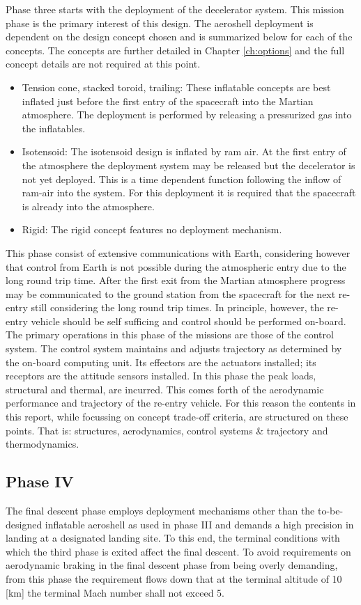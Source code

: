 Phase three starts with the deployment of the decelerator system. This mission phase is the primary interest of this design. The aeroshell deployment is dependent on the design concept chosen and is summarized below for each of the concepts. The concepts are further detailed in Chapter \ref{ch:options} and the full concept details are not required at this point.

\begin{itemize}
\item Tension cone, stacked toroid, trailing: These inflatable concepts are best inflated just before the first entry of the spacecraft into the Martian atmosphere. The deployment is performed by releasing a pressurized gas into the inflatables.
\item Isotensoid: The isotensoid design is inflated by ram air. At the first entry of the atmosphere the deployment system may be released but the decelerator is not yet deployed. This is a time dependent function following the inflow of ram-air into the system. For this deployment it is required that the spacecraft is already into the atmosphere.
\item Rigid: The rigid concept features no deployment mechanism.
\end{itemize}
This phase consist of extensive communications with Earth, considering however that control from Earth is not possible during the atmospheric entry due to the long round trip time. After the first exit from the Martian atmosphere progress may be communicated to the ground station from the spacecraft for the next re-entry still considering the long round trip times. In principle, however, the re-entry vehicle should be self sufficing and control should be performed on-board. The primary operations in this phase of the missions are those of the control system. The control system maintains and adjusts trajectory as determined by the on-board computing unit. Its effectors are the actuators installed; its receptors are the attitude sensors installed. In this phase the peak loads, structural and thermal, are incurred.
This comes forth of the aerodynamic performance and trajectory of the re-entry vehicle. For this reason the contents in this report, while focussing on concept trade-off criteria, are structured on these points. That is: structures, aerodynamics, control systems \& trajectory and thermodynamics.



\subsection{Phase IV}\label{sec:p4}
The final descent phase employs deployment mechanisms other than the to-be-designed inflatable aeroshell as used in phase III and demands a high precision in landing at a designated landing site. To this end, the terminal conditions with which the third phase is exited affect the final descent. To avoid requirements on aerodynamic braking in the final descent phase from being overly demanding, from this phase the requirement flows down that at the terminal altitude of 10 [km] the terminal Mach number shall not exceed 5. 

